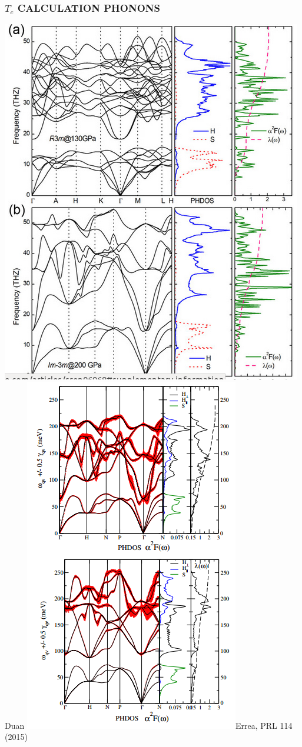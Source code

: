 \documentclass[amssymb,amsmath]{beamer}
\begin{document}
\begin{frame}
\frametitle{$T_c$ CALCULATION PHONONS}
\includegraphics[scale=0.29]{./figures/phonons_duan.png}{\tiny Duan}
\includegraphics[scale=0.29]{./figures/phonons_errea.png}{\tiny Errea, PRL 114 (2015)}\\

\end{frame}
\end{document}

